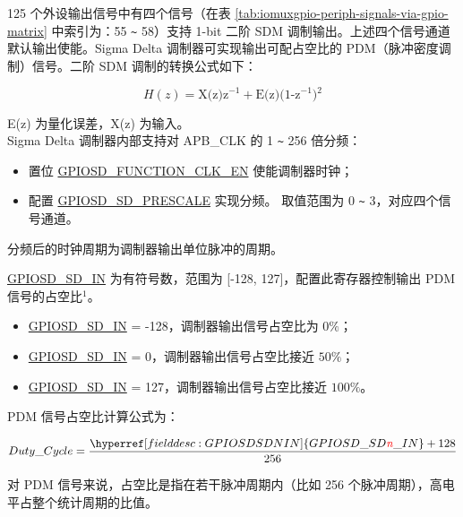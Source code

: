 \documentclass[main\_\_CN.tex]{subfiles}
\begin{document}
125 个外设输出信号中有四个信号（在表 \ref{tab:iomuxgpio-periph-signals-via-gpio-matrix} 中索引为：55 \verb+~+ 58）支持 1-bit 二阶 SDM 调制输出。上述四个信号通道默认输出使能。Sigma Delta 调制器可实现输出可配占空比的 PDM（脉冲密度调制）信号。二阶 SDM 调制的转换公式如下：

\[
    H(z)=\textrm{X(z)z$^{-1}$} + \textrm{E(z)(1-z$^{-1}$)$^{2}$}
    \]

E(z) 为量化误差，X(z) 为输入。\\
Sigma Delta 调制器内部支持对 APB\_CLK 的 1 \verb+~+ 256 倍分频： 
\begin{itemize}
    \item 置位 \hyperref[fielddesc:GPIOSDFUNCTIONCLKEN]{GPIOSD\_FUNCTION\_CLK\_EN} 使能调制器时钟；
    \item 配置 \hyperref[fielddesc:GPIOSDSDNPRESCALE]{GPIOSD\_SD\_PRESCALE} 实现分频。 取值范围为 0 \verb+~+ 3，对应四个信号通道。
\end{itemize}

分频后的时钟周期为调制器输出单位脉冲的周期。

\hyperref[fielddesc:GPIOSDSDNIN]{GPIOSD\_SD\_IN} 为有符号数，范围为 [-128, 127]，配置此寄存器控制输出 PDM 信号的占空比$^{1}$。

\begin{itemize}
    \item \hyperref[fielddesc:GPIOSDSDNIN]{GPIOSD\_SD\_IN} = -128，调制器输出信号占空比为 \begin{math}0\% \end{math}；
    \item \hyperref[fielddesc:GPIOSDSDNIN]{GPIOSD\_SD\_IN} = 0，调制器输出信号占空比接近 \begin{math}50\% \end{math}；
    \item \hyperref[fielddesc:GPIOSDSDNIN]{GPIOSD\_SD\_IN} = 127，调制器输出信号占空比接近 \begin{math}100\% \end{math}。
\end{itemize}

PDM 信号占空比计算公式为：

    \[
    Duty\_Cycle=\frac{\hyperref[fielddesc:GPIOSDSDNIN]{GPIOSD\_SD\regindex{n}\_IN} + 128} {256}
    \]
    
\begin{tiplisting}
对 PDM 信号来说，占空比是指在若干脉冲周期内（比如 256 个脉冲周期），高电平占整个统计周期的比值。
\end{tiplisting}
\end{document}

